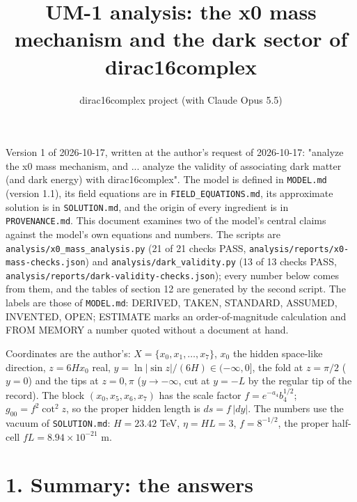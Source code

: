 \documentclass[11pt]{article}
\title{UM-1 analysis: the x0 mass mechanism and the dark sector of dirac16complex}
\author{dirac16complex project (with Claude Opus 5.5)}
\date{}
\begin{document}
\maketitle
\tableofcontents
\newpage

Version 1 of 2026-10-17, written at the author's request of 2026-10-17: "analyze the x0 mass mechanism, and ... analyze the validity of associating dark matter (and dark energy) with dirac16complex". The model is defined in \texttt{MODEL.\allowbreak{}md} (version 1.1), its field equations are in \texttt{FIELD\_\allowbreak{}EQUATIONS.\allowbreak{}md}, its approximate solution is in \texttt{SOLUTION.\allowbreak{}md}, and the origin of every ingredient is in \texttt{PROVENANCE.\allowbreak{}md}. This document examines two of the model's central claims against the model's own equations and numbers. The scripts are \texttt{analysis/\allowbreak{}x0\_\allowbreak{}mass\_\allowbreak{}analysis.\allowbreak{}py} (21 of 21 checks PASS, \texttt{analysis/\allowbreak{}reports/\allowbreak{}x0-{}\allowbreak{}mass-{}\allowbreak{}checks.\allowbreak{}json}) and \texttt{analysis/\allowbreak{}dark\_\allowbreak{}validity.\allowbreak{}py} (13 of 13 checks PASS, \texttt{analysis/\allowbreak{}reports/\allowbreak{}dark-{}\allowbreak{}validity-{}\allowbreak{}checks.\allowbreak{}json}); every number below comes from them, and the tables of section 12 are generated by the second script. The labels are those of \texttt{MODEL.\allowbreak{}md}: DERIVED, TAKEN, STANDARD, ASSUMED, INVENTED, OPEN; ESTIMATE marks an order-of-magnitude calculation and FROM MEMORY a number quoted without a document at hand.

Coordinates are the author's: $X = \{x_0, x_1, \dots, x_7\}$, $x_0$ the hidden space-like direction, $z = 6Hx_0$ real, $y = \ln|\sin z|/(6H) \in (-\infty, 0]$, the fold at $z = \pi/2$ ($y = 0$) and the tips at $z = 0, \pi$ ($y \to -\infty$, cut at $y = -L$ by the regular tip of the record). The block $(x_0, x_5, x_6, x_7)$ has the scale factor $f = e^{-a_4}b_4^{1/2}$; $g_{00} = f^2\cot^2 z$, so the proper hidden length is $ds = f\,|dy|$. The numbers use the vacuum of \texttt{SOLUTION.\allowbreak{}md}: $H = 23.42$ TeV, $\eta = HL = 3$, $f = 8^{-1/2}$, the proper half-cell $fL = 8.94\times10^{-21}$ m.

\section*{1. Summary: the answers}
\end{document}

